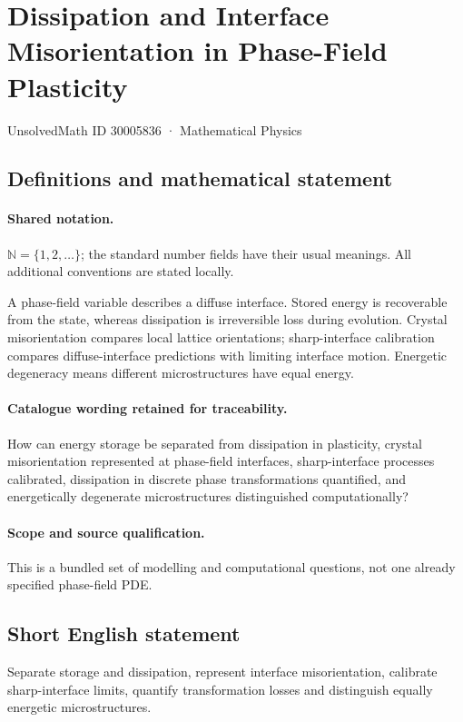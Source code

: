 \documentclass[11pt]{article}
\begin{document}
\setcounter{section}{30005835}
\section{Dissipation and Interface Misorientation in Phase-Field Plasticity}\label{30005836}
{\small UnsolvedMath ID 30005836 · Mathematical Physics}
\subsection{Definitions and mathematical statement}

\paragraph{Shared notation.}$\mathbb N=\{1,2,\ldots\}$; the standard number fields have their usual meanings. All additional conventions are stated locally.


A phase-field variable describes a diffuse interface. Stored energy is recoverable from the state, whereas dissipation is irreversible loss during evolution. Crystal misorientation compares local lattice orientations; sharp-interface calibration compares diffuse-interface predictions with limiting interface motion. Energetic degeneracy means different microstructures have equal energy.

\paragraph{Catalogue wording retained for traceability.}
How can energy storage be separated from dissipation in plasticity, crystal misorientation represented at phase-field interfaces, sharp-interface processes calibrated, dissipation in discrete phase transformations quantified, and energetically degenerate microstructures distinguished computationally?

\paragraph{Scope and source qualification.}This is a bundled set of modelling and computational questions, not one already specified phase-field PDE.
\subsection{Short English statement}
Separate storage and dissipation, represent interface misorientation, calibrate sharp-interface limits, quantify transformation losses and distinguish equally energetic microstructures.
\end{document}
